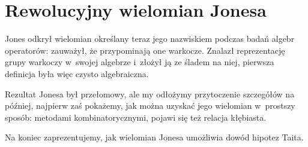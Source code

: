 
\section{Rewolucyjny wielomian Jonesa}
%
Jones odkrył wielomian określany teraz jego nazwiskiem podczas badań algebr operatorów: zauważył, że przypominają one warkocze.
Znalazł reprezentację grupy warkoczy w~swojej algebrze i~złożył ją ze śladem na niej, pierwsza definicja była więc czysto algebraiczna.

Rezultat Jonesa był przełomowy, ale my odłożymy przytoczenie szczegółów na później, najpierw zaś pokażemy, jak można uzyskać jego wielomian w~prostszy sposób: metodami kombinatorycznymi, pojawi się też relacja kłębiasta.

Na koniec zaprezentujemy, jak wielomian Jonesa umożliwia dowód hipotez Taita.













%


